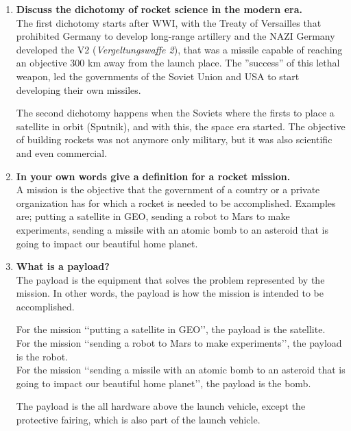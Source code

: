 \documentclass{article}
\begin{document}
\begin{enumerate}

	\item {\bf Discuss the dichotomy of rocket science in the modern era.}\\
	
The first dichotomy starts after WWI, with the Treaty of Versailles that prohibited Germany to develop long-range artillery and the NAZI Germany developed the V2 (\textit{Vergeltungswaffe 2}), that was a missile capable of reaching an objective 300 km away from the launch place. The ''success'' of this lethal weapon, led the governments of the Soviet Union and USA to start developing their own missiles.

The second dichotomy happens when the Soviets where the firsts to place a satellite in orbit (Sputnik), and with this, the space era started. The objective of building rockets was not anymore only military, but it was also scientific and even commercial. 

	\item {\bf In your own words give a definition for a rocket mission.}\\
	
A mission is the objective that the government of a country or a private organization has for which a rocket is needed to be accomplished. Examples are; putting a satellite in GEO, sending a robot to Mars to make experiments, sending a missile with an atomic bomb to an asteroid that is going to impact our beautiful home planet.
	
	\item {\bf What is a payload?}\\
	
The payload is the equipment that solves the problem represented by the mission. In other words, the payload is how the mission is intended to be accomplished.

For the mission \lq\lq{}putting a satellite in GEO\rq\rq{}, the payload is the satellite.\\
For the mission \lq\lq{}sending a robot to Mars to make experiments\rq\rq{}, the payload is the robot.\\
For the mission \lq\lq{}sending a missile with an atomic bomb to an asteroid that is going to impact our beautiful home planet\rq\rq{}, the payload is the bomb.

The payload is the all hardware above the launch vehicle, except the protective fairing, which is also part of the launch vehicle. 
	

\end{enumerate}
\end{document}
